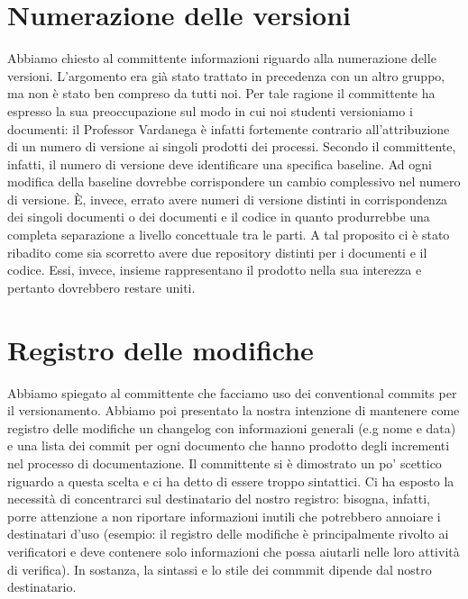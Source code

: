 \documentclass{article}
\begin{document}
\section{Numerazione delle versioni}%
\label{sec:numerazione_delle_versioni}

Abbiamo chiesto al committente informazioni riguardo alla numerazione delle versioni. L'argomento era già stato trattato in precedenza con un altro gruppo, ma non è stato ben compreso da tutti noi. Per tale ragione il committente ha espresso la sua preoccupazione sul modo in cui noi studenti versioniamo i documenti: il Professor Vardanega è infatti fortemente contrario all'attribuzione di un numero di versione ai singoli prodotti dei processi. Secondo il committente, infatti, il numero di versione deve identificare una specifica baseline. Ad ogni modifica della baseline dovrebbe corrispondere un cambio complessivo nel numero di versione. È, invece, errato  avere numeri di versione distinti in corrispondenza dei singoli documenti o dei documenti e il codice in quanto produrrebbe una completa separazione a livello concettuale tra le parti. A tal proposito ci è stato ribadito come sia scorretto avere due repository distinti per i documenti e il codice. Essi, invece, insieme rappresentano il prodotto nella sua interezza e pertanto dovrebbero restare uniti.

\section{Registro delle modifiche}%
\label{sec:registro_delle_modifiche}

Abbiamo spiegato al committente che facciamo uso dei conventional commits per il versionamento. Abbiamo poi presentato la nostra intenzione di mantenere come registro delle modifiche un changelog con informazioni generali (e.g nome e data) e una lista dei commit per ogni documento che hanno prodotto degli incrementi nel processo di documentazione. Il committente si è dimostrato un po' scettico riguardo a questa scelta e ci ha detto di essere troppo sintattici. Ci ha esposto la necessità di concentrarci sul destinatario del nostro registro: bisogna, infatti, porre attenzione a non riportare informazioni inutili che potrebbero annoiare i destinatari d'uso (esempio: il registro delle modifiche è principalmente rivolto ai verificatori e deve contenere solo informazioni che possa aiutarli nelle loro attività di verifica). In sostanza, la sintassi e lo stile dei commmit dipende dal nostro destinatario.
\end{document}
